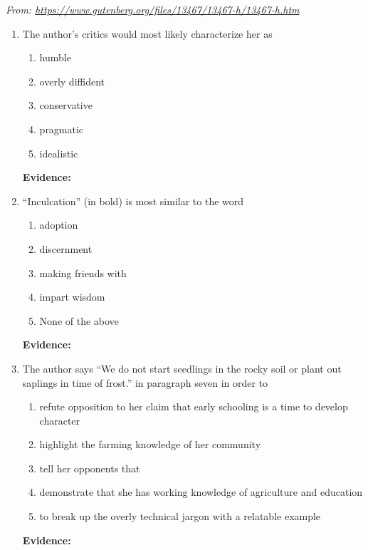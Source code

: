 \textit{From: \url{https://www.gutenberg.org/files/13467/13467-h/13467-h.htm}}

\bigskip
\begin{enumerate}

\item 

\bigskip The author's critics would most likely characterize her as 
\begin{enumerate}[label=(\Alph*)]
\item humble
\item overly diffident
\item conservative
\item pragmatic
\item idealistic
\end{enumerate}

\bigskip
\textbf{Evidence:} \hrulefill

\bigskip
\item ``Inculcation'' (in bold) is most similar to the word

\begin{enumerate}[label=(\Alph*)]
\item adoption 
\item discernment 
\item making friends with
\item impart wisdom
\item None of the above
\end{enumerate}

\bigskip
\textbf{Evidence:} \hrulefill

\bigskip
\item The author says ``We do not start seedlings in the rocky soil or plant out saplings in time of frost.'' in paragraph seven in order to

\begin{enumerate}[label=(\Alph*)]
\item refute opposition to her claim that early schooling is a time to develop character
\item highlight the farming knowledge of her community
\item tell her opponents that 
\item demonstrate that she has working knowledge of agriculture and education
\item to break up the overly technical jargon with a relatable example
\end{enumerate}

\bigskip
\textbf{Evidence:} \hrulefill



\end{enumerate}
